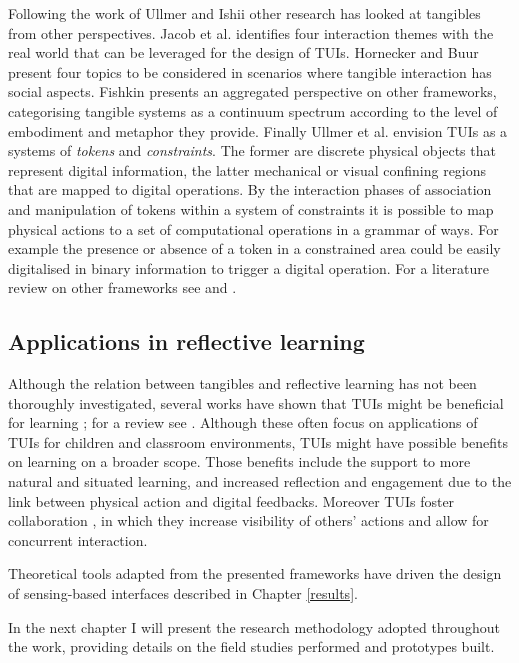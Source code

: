 Following the work of Ullmer and Ishii other research has looked at tangibles from other perspectives. Jacob et al. \autocite*{Jacob:2008vm} identifies four interaction themes with the real world that can be leveraged for the design of TUIs. Hornecker and Buur \autocite*{Hornecker:2006uq} present four topics to be considered in scenarios where tangible interaction has social aspects. Fishkin \autocite{Fishkin:2004uv} presents an aggregated perspective on other frameworks, categorising tangible systems as a continuum spectrum according to the level of embodiment and metaphor they provide. Finally Ullmer et al. \autocite{Ullmer:2005jz} envision TUIs as a systems of \emph{tokens} and \emph{constraints}. The former are discrete physical objects that represent digital information, the latter mechanical or visual confining regions that are mapped to digital operations. By the interaction phases of association and manipulation of tokens within a system of constraints it is possible to map physical actions to a set of computational operations in a grammar of ways. For example the presence or absence of a token in a constrained area could be easily digitalised in binary information to trigger a digital operation. For a literature review on other frameworks see \autocite{Mazalek:2009uy} and \autocite{Shaer:2009fx}.

\subsection{Applications in reflective learning}\label{applications-of-tangibles-in-reflective-learning}

Although the relation between tangibles and reflective learning has not been thoroughly investigated, several works have shown that TUIs might be beneficial for learning \autocite{Marshall:2007dr}; for a review see \autocite{omalley:hal-00190328}. Although these often focus on applications of TUIs for children and classroom environments, TUIs might have possible benefits on learning on a broader scope. Those benefits include the support to more natural \autocite{Terrenghi:2005gq} and situated \autocite{Klemmer:2006ez} learning, and increased reflection and engagement \autocite{Rogers:2006te} due to the link between physical action and digital feedbacks. Moreover TUIs foster collaboration \autocite{Rogers:2003tt}, in which they increase visibility of others' actions and allow for concurrent interaction.

Theoretical tools adapted from the presented frameworks have driven the design of sensing-based interfaces described in Chapter \ref{results}.

In the next chapter I will present the research methodology adopted throughout the work, providing details on the field studies performed and prototypes built. 
